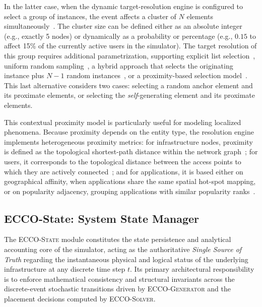 \documentclass[ASNA]{USG} %
\begin{document}
In the latter case, when the dynamic target-resolution engine is configured to select a group of instances, the event affects a cluster of $N$ elements simultaneously~\cite{Roumeliotis2025Multi}. The cluster size can be defined either as an absolute integer (e.g., exactly 5 nodes) or dynamically as a probability or percentage (e.g., $0.15$ to affect 15\% of the currently active users in the simulator). The target resolution of this group requires additional parametrization, supporting explicit list selection~\cite{Xiong2019A}, uniform random sampling~\cite{Roumeliotis2025Multi}, a hybrid approach that selects the originating instance plus $N-1$ random instances~\cite{Wu2020Bilateral}, or a proximity-based selection model~\cite{Li2020Privacy}. This last alternative considers two cases: selecting a random anchor element and its proximate elements, or selecting the \textit{self}-generating element and its proximate elements.

This contextual proximity model is particularly useful for modeling localized phenomena. Because proximity depends on the entity type, the resolution engine implements heterogeneous proximity metrics: for infrastructure nodes, proximity is defined as the topological shortest-path distance within the network graph~\cite{Li2020Privacy}; for users, it corresponds to the topological distance between the access points to which they are actively connected~\cite{Wang2020Collaborative}; and for applications, it is based either on geographical affinity, when applications share the same spatial hot-spot mapping, or on popularity adjacency, grouping applications with similar popularity ranks~\cite{Huang2026Edge}.



\subsection{ECCO-State: System State Manager}
\label{subsec:ecco_state}

The \textsc{ECCO-State} module constitutes the state persistence and analytical accounting core of the simulator, acting as the authoritative \emph{Single Source of Truth} regarding the instantaneous physical and logical status of the underlying infrastructure at any discrete time step $t$. Its primary architectural responsibility is to enforce mathematical consistency and structural invariants across the discrete-event stochastic transitions driven by \textsc{ECCO-Generator} and the placement decisions computed by \textsc{ECCO-Solver}.
\end{document}
